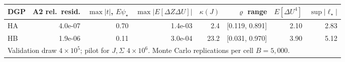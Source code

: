 \begin{tabular}{lrrrrrrr}
\toprule
DGP & A2 rel.\ resid. & $\max|t|$, $E\psi_\star$ & $\max|E[\Delta Z\Delta U]|$ & $\kappa(J)$ & $\varrho$ range & $E[\Delta U^4]$ & $\sup|\ell_\star|$ \\
\midrule
HA & 4.0e-07 & 0.70 & 1.4e-03 & 2.4 & [0.119, 0.891] & 2.10 & 2.83 \\
HB & 1.9e-06 & 0.11 & 3.0e-04 & 23.2 & [0.031, 0.970] & 3.90 & 5.12 \\
\midrule
\multicolumn{8}{l}{Validation draw $4\times10^5$; pilot for $J,\Sigma$ $4\times10^6$. Monte Carlo replications per cell $B=5,000$.} \\
\bottomrule
\end{tabular}
